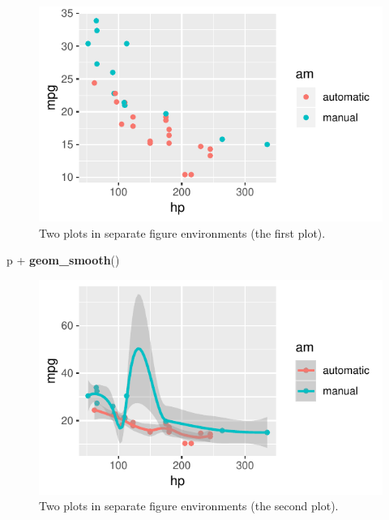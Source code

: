 \documentclass[]{tufte-handout}
\newenvironment{Shaded}{}{}
\newcommand{\KeywordTok}[1]{\textcolor[rgb]{0.00,0.44,0.13}{\textbf{#1}}}
\newcommand{\StringTok}[1]{\textcolor[rgb]{0.25,0.44,0.63}{#1}}
\newcommand{\OperatorTok}[1]{\textcolor[rgb]{0.40,0.40,0.40}{#1}}
\newcommand{\NormalTok}[1]{#1}
\begin{document}
\begin{figure}
\includegraphics{TufteExample_files/figure-latex/fig-two-separate-1} \caption[Two plots in separate figure environments (the first plot)]{Two plots in separate figure environments (the first plot).}\label{fig:fig-two-separate1}
\end{figure}

\begin{Shaded}
\begin{Highlighting}[]
\NormalTok{p }\OperatorTok{+}\StringTok{ }\KeywordTok{geom_smooth}\NormalTok{()}
\end{Highlighting}
\end{Shaded}

\begin{figure}
\includegraphics{TufteExample_files/figure-latex/fig-two-separate-2} \caption[Two plots in separate figure environments (the second plot)]{Two plots in separate figure environments (the second plot).}\label{fig:fig-two-separate2}
\end{figure}
\end{document}
